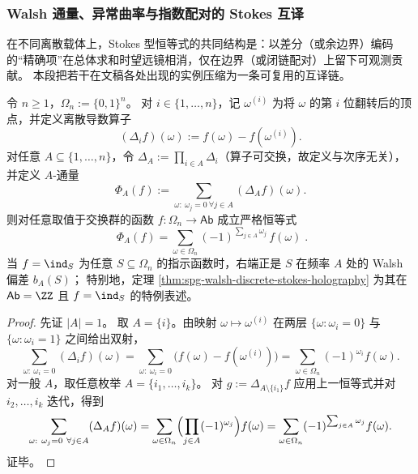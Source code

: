 \subsubsection{Walsh 通量、异常曲率与指数配对的 Stokes 互译}\label{subsubsec:discussion-generalized-stokes-spectral-hierarchy}
在不同离散载体上，Stokes 型恒等式的共同结构是：以差分（或余边界）编码的“精确项”在总体求和时望远镜相消，仅在边界（或闭链配对）上留下可观测贡献。
本段把若干在文稿各处出现的实例压缩为一条可复用的互译链。

\begin{theorem}\label{thm:discussion-walsh-stokes-higher-flux}
令 \(n\ge 1\)，\(\Omega_n:=\{0,1\}^n\)。
对 \(i\in\{1,\dots,n\}\)，记 \(\omega^{(i)}\) 为将 \(\omega\) 的第 \(i\) 位翻转后的顶点，并定义离散导数算子
\[
(\Delta_i f)(\omega):=f(\omega)-f(\omega^{(i)}).
\]
对任意 \(A\subseteq\{1,\dots,n\}\)，令 \(\Delta_A:=\prod_{i\in A}\Delta_i\)（算子可交换，故定义与次序无关），并定义 \(A\)-通量
\[
\Phi_A(f):=\sum_{\omega:\ \omega_j=0\ \forall j\in A}(\Delta_A f)(\omega).
\]
则对任意取值于交换群的函数 \(f:\Omega_n\to \mathsf{Ab}\) 成立严格恒等式
\[
\boxed{\;
\Phi_A(f)=\sum_{\omega\in\Omega_n}(-1)^{\sum_{j\in A}\omega_j}\,f(\omega)\; }.
\]
当 \(f=\ind_S\) 为任意 \(S\subseteq\Omega_n\) 的指示函数时，右端正是 \(S\) 在频率 \(A\) 处的 Walsh 偏差 \(b_A(S)\)；
特别地，定理 \ref{thm:spg-walsh-discrete-stokes-holography} 为其在 \(\mathsf{Ab}=\ZZ\) 且 \(f=\ind_S\) 的特例表述。
\end{theorem}
\begin{proof}
先证 \(|A|=1\)。
取 \(A=\{i\}\)。由映射 \(\omega\mapsto\omega^{(i)}\) 在两层 \(\{\omega:\omega_i=0\}\) 与 \(\{\omega:\omega_i=1\}\) 之间给出双射，
\[
\sum_{\omega:\ \omega_i=0}(\Delta_i f)(\omega)
=\sum_{\omega:\ \omega_i=0}\bigl(f(\omega)-f(\omega^{(i)})\bigr)
=\sum_{\omega\in\Omega_n}(-1)^{\omega_i}f(\omega).
\]
对一般 \(A\)，取任意枚举 \(A=\{i_1,\dots,i_k\}\)。
对 \(g:=\Delta_{A\setminus\{i_1\}}f\) 应用上一恒等式并对 \(i_2,\dots,i_k\) 迭代，得到
\[
\sum_{\omega:\ \omega_j=0\ \forall j\in A}(\Delta_A f)(\omega)
=\sum_{\omega\in\Omega_n}\Bigl(\prod_{j\in A}(-1)^{\omega_j}\Bigr)f(\omega)
=\sum_{\omega\in\Omega_n}(-1)^{\sum_{j\in A}\omega_j}f(\omega).
\]
证毕。
\end{proof}

